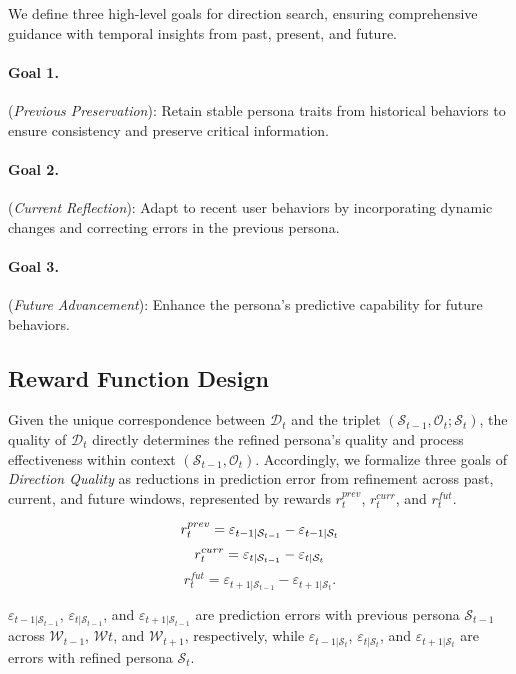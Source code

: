 We define three high-level goals for direction search, ensuring comprehensive guidance with temporal insights from past, present, and future.

\noindent
\paragraph{Goal 1.} (\textit{Previous Preservation}): 
Retain stable persona traits from historical behaviors to ensure consistency and preserve critical information.

\noindent
\paragraph{Goal 2.} (\textit{Current Reflection}): Adapt to recent user behaviors by incorporating dynamic changes and correcting errors in the previous persona.

\noindent
\paragraph{Goal 3.} (\textit{Future Advancement}): Enhance the persona’s predictive capability for future behaviors.

\subsection{Reward Function Design}
Given the unique correspondence between $\mathcal{D}_t$ and the triplet $(\mathcal{S}_{t-1}, \mathcal{O}_t; \mathcal{S}_t)$, the quality of $\mathcal{D}_t$ directly determines the refined persona’s quality and process effectiveness within context $(\mathcal{S}_{t-1}, \mathcal{O}_t)$. Accordingly, we formalize three goals of \textit{Direction Quality} as reductions in prediction error from refinement across past, current, and future windows, represented by rewards $r_t^{prev}$, $r_t^{curr}$, and $r_t^{fut}$.

\vspace{-2mm}
\[
r_t^{prev} = \varepsilon_{t-1|\mathcal{S}_{t-1}} - \varepsilon_{t-1|\mathcal{S}_t}
\vspace{-2mm}
\]
\[
r_t^{curr} = \varepsilon_{t|\mathcal{S}_{t-1}} - \varepsilon_{t|\mathcal{S}_t}
\vspace{-2mm}
\]
\[
r_t^{fut} = \varepsilon_{t+1|\mathcal{S}_{t-1}} - \varepsilon_{t+1|\mathcal{S}_t}. \tag{8}
\]

\noindent
$\varepsilon_{t-1|\mathcal{S}_{t-1}}$, $\varepsilon_{t|\mathcal{S}_{t-1}}$, and $\varepsilon_{t+1|\mathcal{S}_{t-1}}$ are prediction errors with previous persona $\mathcal{S}_{t-1}$ across $\mathcal{W}_{t-1}$, $\mathcal{W}t$, and $\mathcal{W}_{t+1}$, respectively, while $\varepsilon_{t-1|\mathcal{S}_t}$, $\varepsilon_{t|\mathcal{S}_t}$, and $\varepsilon_{t+1|\mathcal{S}_t}$ are errors with refined persona $\mathcal{S}_t$.

